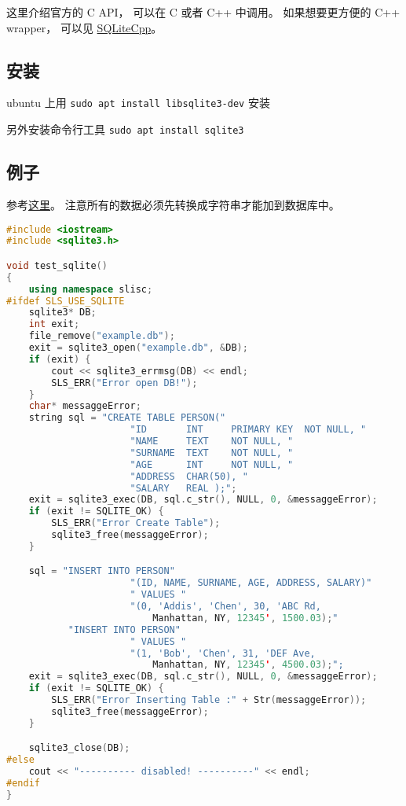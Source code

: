 
\begin{issues}
\issueDraft
\end{issues}


这里介绍官方的 C API， 可以在 C 或者 C++ 中调用。 如果想要更方便的 C++ wrapper， 可以见 \href{https://github.com/SRombauts/SQLiteCpp}{SQLiteCpp}。

\subsection{安装}
ubuntu 上用 \verb|sudo apt install libsqlite3-dev| 安装

另外安装命令行工具 \verb|sudo apt install sqlite3|

\subsection{例子}
参考\href{https://www.tutorialspoint.com/sqlite/sqlite_c_cpp.htm}{这里}。 注意所有的数据必须先转换成字符串才能加到数据库中。
\begin{lstlisting}[language=cpp]
#include <iostream>
#include <sqlite3.h>

void test_sqlite()
{
	using namespace slisc;
#ifdef SLS_USE_SQLITE
	sqlite3* DB;
	int exit;
	file_remove("example.db");
	exit = sqlite3_open("example.db", &DB);
	if (exit) {
		cout << sqlite3_errmsg(DB) << endl;
		SLS_ERR("Error open DB!");
	}
	char* messaggeError;
	string sql = "CREATE TABLE PERSON("
					  "ID       INT     PRIMARY KEY  NOT NULL, "
					  "NAME     TEXT    NOT NULL, "
					  "SURNAME  TEXT    NOT NULL, "
					  "AGE      INT     NOT NULL, "
					  "ADDRESS  CHAR(50), "
					  "SALARY   REAL );";
	exit = sqlite3_exec(DB, sql.c_str(), NULL, 0, &messaggeError);
	if (exit != SQLITE_OK) {
		SLS_ERR("Error Create Table");
		sqlite3_free(messaggeError);
	}

	sql = "INSERT INTO PERSON"
					  "(ID, NAME, SURNAME, AGE, ADDRESS, SALARY)"
					  " VALUES "
					  "(0, 'Addis', 'Chen', 30, 'ABC Rd,
                          Manhattan, NY, 12345', 1500.03);"
		   "INSERT INTO PERSON"
					  " VALUES "
					  "(1, 'Bob', 'Chen', 31, 'DEF Ave,
                          Manhattan, NY, 12345', 4500.03);";
	exit = sqlite3_exec(DB, sql.c_str(), NULL, 0, &messaggeError);
	if (exit != SQLITE_OK) {
		SLS_ERR("Error Inserting Table :" + Str(messaggeError));
		sqlite3_free(messaggeError);
	}

	sqlite3_close(DB);
#else
	cout << "---------- disabled! ----------" << endl;
#endif
}
\end{lstlisting}

